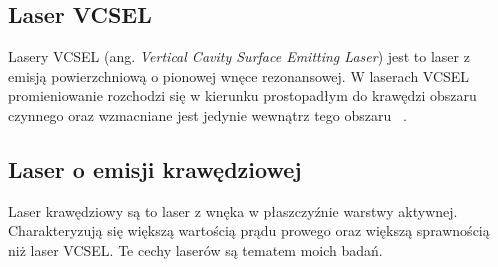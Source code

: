 \subsection{Laser VCSEL}
Lasery VCSEL (ang. \textit{Vertical Cavity Surface Emitting Laser}) jest to laser z emisją powierzchniową o pionowej wnęce rezonansowej.
W laserach VCSEL promieniowanie rozchodzi się  w kierunku prostopadłym do krawędzi obszaru czynnego oraz wzmacniane jest jedynie
wewnątrz tego obszaru ~\cite{publikcja_nakwaski}.
\subsection{Laser o emisji krawędziowej}
Laser krawędziowy są to laser z wnęka w  płaszczyźnie warstwy aktywnej. Charakteryzują się większą wartością prądu prowego
oraz większą sprawnością niż laser VCSEL. Te cechy laserów są tematem moich badań.
